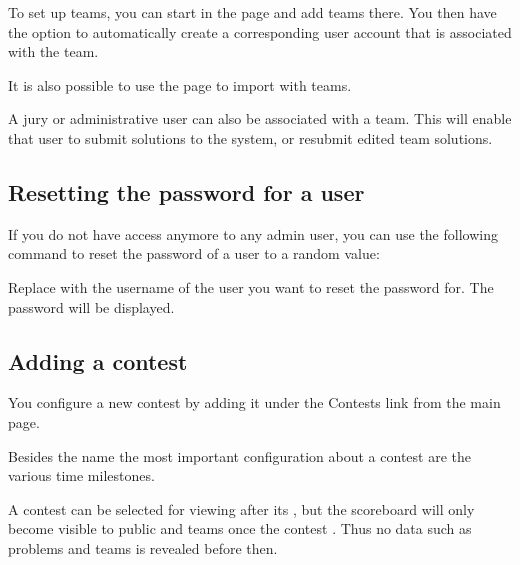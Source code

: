 \documentclass[a4paper,10pt,english,openany]{sphinxmanual}
\begin{document}
\sphinxAtStartPar
To set up teams, you can start in the  page and add teams there.
You then have the option to automatically create a corresponding user
account that is associated with the team.

\sphinxAtStartPar
It is also possible to use the  page to import
 with teams.

\sphinxAtStartPar
A jury or administrative user can also be associated with a team. This
will enable that user to submit solutions to the system, or resubmit
edited team solutions.


\subsection{Resetting the password for a user}
\label{\detokenize{config-basic:resetting-the-password-for-a-user}}
\sphinxAtStartPar
If you do not have access anymore to any admin user, you can use the following
command to reset the password of a user to a random value:

\begin{sphinxVerbatim}[commandchars=\\\{\}]
  
\end{sphinxVerbatim}

\sphinxAtStartPar
Replace  with the username of the user you want to reset the password for.
The password will be displayed.


\subsection{Adding a contest}
\label{\detokenize{config-basic:adding-a-contest}}
\sphinxAtStartPar
You configure a new contest by adding it under the Contests link
from the main page.

\sphinxAtStartPar
Besides the name the most important configuration about a contest
are the various time milestones.

\sphinxAtStartPar
A contest can be selected for viewing after its , but
the scoreboard will only become visible to public and teams once the
contest . Thus no data such as problems and teams is revealed
before then.
\end{document}
